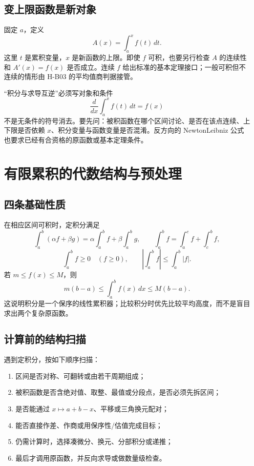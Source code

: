 \documentclass[11pt,a4paper,fontset=fandol]{ctexart}
\begin{document}
\subsection{变上限函数是新对象}

固定 $a$，定义
\[
A(x)=\int_a^x f(t)\,dt.
\]
这里 $t$ 是累积变量，$x$ 是新函数的上限。即使 $f$ 可积，也要另行检查 $A$ 的连续性和 $A'(x)=f(x)$ 是否成立。连续 $f$ 给出标准的基本定理接口；一般可积但不连续的情形由 H-B03 的平均值商判据接管。

\begin{warnbox}{“积分与求导互逆”必须写对象和条件}
\[
\frac{d}{dx}\int_a^x f(t)\,dt=f(x)
\]
不是无条件的符号消去。要先问：被积函数在哪个区间讨论、是否在该点连续、上下限是否依赖 $x$、积分变量与函数变量是否混淆。反方向的 Newton\textendash{}Leibniz 公式也要求已经有合资格的原函数或基本定理条件。
\end{warnbox}

\section{有限累积的代数结构与预处理}

\subsection{四条基础性质}

在相应区间可积时，定积分满足
\[
\int_a^b(\alpha f+\beta g)=\alpha\int_a^b{f}+\beta\int_a^b{g},
\qquad
\int_a^b{f}=\int_a^c{f}+\int_c^b{f},
\]
\[
\int_a^b{f}\ge0\quad(f\ge0),
\qquad
\left|\int_a^b{f}\right|\le\int_a^b{|f|}.
\]
若 $m\le f(x)\le M$，则
\[
m(b-a)\le\int_a^b{f(x)}\,dx\le M(b-a).
\]
这说明积分是一个保序的线性累积器；比较积分时优先比较平均高度，而不是盲目求出两个复杂原函数。

\subsection{计算前的结构扫描}

遇到定积分，按如下顺序扫描：
\begin{enumerate}
  \item 区间是否对称、可翻转或由若干周期组成；
  \item 被积函数是否含绝对值、取整、最值或分段点，是否必须先拆区间；
  \item 是否能通过 $x\mapsto a+b-x$、平移或三角换元配对；
  \item 能否直接作差、作商或用保序性/估值完成目标；
  \item 仍需计算时，选择凑微分、换元、分部积分或递推；
  \item 最后才调用原函数，并反向求导或做数量级检查。
\end{enumerate}
\end{document}

